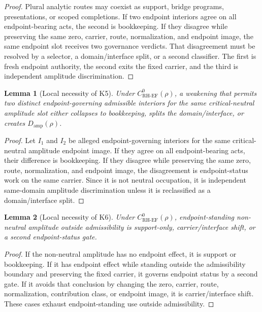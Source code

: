 \documentclass[11pt]{article}
\newtheorem{lemma}{Lemma}[section]
\newcommand{\Damp}{D_{\mathrm{amp}}}
\newcommand{\CoreRHEF}{C^{0}_{\mathrm{RH}\text{-}\mathrm{EF}}}
\begin{document}
\begin{proof}
Plural analytic routes may coexist as support, bridge programs, presentations, or scoped completions.  If two endpoint interiors agree on all endpoint-bearing acts, the second is bookkeeping.  If they disagree while preserving the same zero, carrier, route, normalization, and endpoint image, the same endpoint slot receives two governance verdicts.  That disagreement must be resolved by a selector, a domain/interface split, or a second classifier.  The first is fresh endpoint authority, the second exits the fixed carrier, and the third is independent amplitude discrimination.
\end{proof}

\begin{lemma}[Local necessity of K5]
Under \(\CoreRHEF(\rho)\), a weakening that permits two distinct endpoint-governing admissible interiors for the same critical-neutral amplitude slot either collapses to bookkeeping, splits the domain/interface, or creates \(\Damp(\rho)\).
\end{lemma}

\begin{proof}
Let \(I_1\) and \(I_2\) be alleged endpoint-governing interiors for the same critical-neutral amplitude endpoint image.  If they agree on all endpoint-bearing acts, their difference is bookkeeping.  If they disagree while preserving the same zero, route, normalization, and endpoint image, the disagreement is endpoint-status work on the same carrier.  Since it is not neutral occupation, it is independent same-domain amplitude discrimination unless it is reclassified as a domain/interface split.
\end{proof}

\begin{lemma}[Local necessity of K6]
Under \(\CoreRHEF(\rho)\), endpoint-standing non-neutral amplitude outside admissibility is support-only, carrier/interface shift, or a second endpoint-status gate.
\end{lemma}

\begin{proof}
If the non-neutral amplitude has no endpoint effect, it is support or bookkeeping.  If it has endpoint effect while standing outside the admissibility boundary and preserving the fixed carrier, it governs endpoint status by a second gate.  If it avoids that conclusion by changing the zero, carrier, route, normalization, contribution class, or endpoint image, it is carrier/interface shift.  These cases exhaust endpoint-standing use outside admissibility.
\end{proof}
\end{document}
